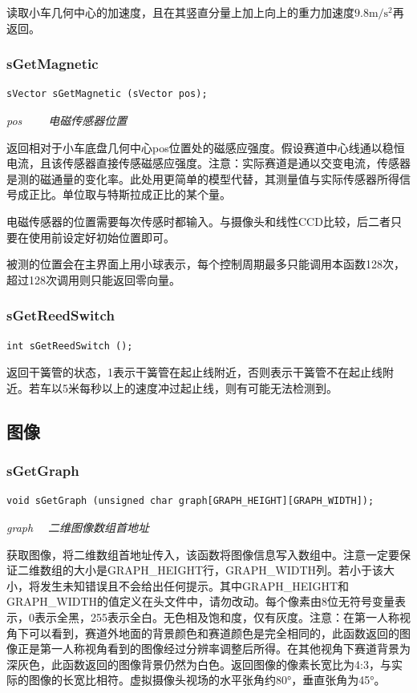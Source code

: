 \documentclass[titlepage,a4paper]{ctexart}
\begin{document}
读取小车几何中心的加速度，且在其竖直分量上加上向上的重力加速度$9.8 \mathrm{m/s^2}$再返回。 \\

\subsubsection{sGetMagnetic}
\begin{lstlisting}[numbers=none]
sVector sGetMagnetic (sVector pos);
\end{lstlisting}
\par \emph{pos 　　电磁传感器位置}

返回相对于小车底盘几何中心pos位置处的磁感应强度。假设赛道中心线通以稳恒电流，且该传感器直接传感磁感应强度。注意：实际赛道是通以交变电流，传感器是测的磁通量的变化率。此处用更简单的模型代替，其测量值与实际传感器所得信号成正比。单位取与特斯拉成正比的某个量。

电磁传感器的位置需要每次传感时都输入。与摄像头和线性CCD比较，后二者只要在使用前设定好初始位置即可。

被测的位置会在主界面上用小球表示，每个控制周期最多只能调用本函数128次，超过128次调用则只能返回零向量。 \\


\subsubsection{sGetReedSwitch}
\begin{lstlisting}[numbers=none]
int sGetReedSwitch ();
\end{lstlisting}

返回干簧管的状态，1表示干簧管在起止线附近，否则表示干簧管不在起止线附近。若车以5米每秒以上的速度冲过起止线，则有可能无法检测到。\\

\subsection{图像}
\subsubsection{sGetGraph}
\begin{lstlisting}[numbers=none]
void sGetGraph (unsigned char graph[GRAPH_HEIGHT][GRAPH_WIDTH]);
\end{lstlisting}
\par \emph{graph 　二维图像数组首地址}

获取图像，将二维数组首地址传入，该函数将图像信息写入数组中。注意一定要保证二维数组的大小是GRAPH\_HEIGHT行，GRAPH\_WIDTH列。若小于该大小，将发生未知错误且不会给出任何提示。其中GRAPH\_HEIGHT和GRAPH\_WIDTH的值定义在头文件中，请勿改动。每个像素由8位无符号变量表示，0表示全黑，255表示全白。无色相及饱和度，仅有灰度。注意：在第一人称视角下可以看到，赛道外地面的背景颜色和赛道颜色是完全相同的，此函数返回的图像正是第一人称视角看到的图像经过分辨率调整后所得。在其他视角下赛道背景为深灰色，此函数返回的图像背景仍然为白色。返回图像的像素长宽比为4:3，与实际的图像的长宽比相符。虚拟摄像头视场的水平张角约80°，垂直张角为45°。 \\
\end{document}
